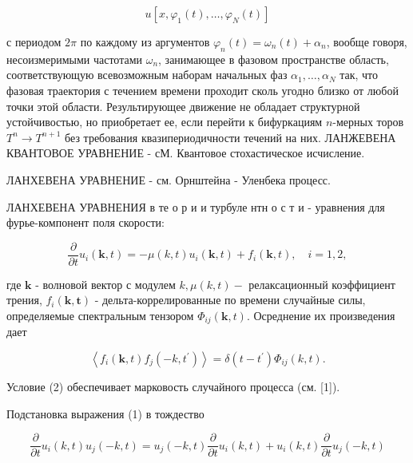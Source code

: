 \documentclass[10pt]{article}
\begin{document}
\[

u\left[x, \varphi_{1}(t), \ldots, \varphi_{N}(t)\right]

\]



с периодом $2 \pi$ по каждому из аргументов $\varphi_{n}(t)=\omega_{n}(t)+\alpha_{n}$, вообще говоря, несоизмеримыми частотами $\omega_{n}$, занимающее в фазовом пространстве область, соответствующую всевозможным наборам начальных фаз $\alpha_{1}, \ldots, \alpha_{N}$ так, что фазовая траектория с течением времени проходит сколь угодно близко от любой точки этой области. Результирующее движение не обладает структурной устойчивостью, но приобретает ее, если перейти к бифуркациям $n$-мерных торов $T^{n} \rightarrow T^{n+1}$ без требования квазипериодичности течений на них. ЛАНЖЕВЕНА КВАНТОВОЕ УРАВНЕНИЕ - сМ. Квантовое стохастическое исчисление.



ЛАНХЕВЕНА УРАВНЕНИЕ - см. Орнштейна - Уленбека процесс.



ЛАНХЕВЕНА УРАВНЕНИЯ в те о р и и турбуле нтн о с т и - уравнения для фурье-компонент поля скорости:



\[

\frac{\partial}{\partial t} u_{i}(\boldsymbol{k}, t)=-\mu(k, t) u_{i}(\boldsymbol{k}, t)+f_{i}(\boldsymbol{k}, t), \quad i=1,2,

\]



где $\boldsymbol{k}$ - волновой вектор с модулем $k, \mu(k, t)-$ релаксационный коэффициент трения, $f_{i}(\boldsymbol{k}, \boldsymbol{t})$ - дельта-коррелированные по времени случайные силы, определяемые спектральным тензором $\Phi_{i j}(\boldsymbol{k}, t)$. Осреднение их произведения дает



\[

\left\langle f_{i}(\boldsymbol{k}, t) f_{j}\left(-k, t^{\prime}\right)\right\rangle=\delta\left(t-t^{\prime}\right) \Phi_{i j}(k, t) .

\]



Условие (2) обеспечивает марковость случайного процесса (см. [1]).



Подстановка выражения (1) в тождество



\[

\frac{\partial}{\partial t} u_{i}(k, t) u_{j}(-k, t)=u_{j}(-k, t) \frac{\partial}{\partial t} u_{i}(k, t)+u_{i}(k, t) \frac{\partial}{\partial t} u_{j}(-k, t)

\]
\end{document}
